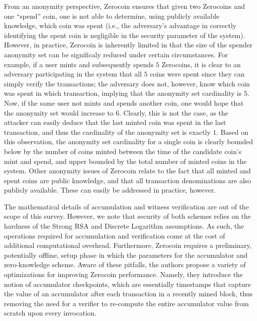 From an anonymity perspective, Zerocoin ensures that given two Zerocoins and one ``spend'' coin, one is not able to determine, using publicly available knowledge, which coin was spent (i.e., the adversary's advantage in correctly identifying the spent coin is negligible in the security parameter of the system). However, in practice, Zerocoin is inherently limited in that the size of the spender anonymity set can be significaly reduced under certain circumstances. For example, if a user mints and subsequently spends $5$ Zerocoins, it is clear to an adversary participating in the system that all $5$ coins were spent since they can simply verify the transactions; the adversary does not, however, know which coin was spent in which transaction, implying that the anonymity set cardinality is $5$. Now, if the same user not mints and spends another coin, one would hope that the anonymity set would increase to $6$. Clearly, this is not the case, as the attacker can easily deduce that the last minted coin was spent in the last transaction, and thus the cardinality of the anonymity set is exactly $1$. Based on this observation, the anonymity set cardinality for a single coin is clearly bounded below by the number of coins minted between the time of the candidate coin's mint and spend, and upper bounded by the total number of minted coins in the system. Other anonymity issues of Zerocoin relate to the fact that all minted and spent coins are public knowledge, and that all transaction denominations are also publicly available. These can easily be addressed in practice, however.

The mathematical details of accumulation and witness verification are out of the scope of this survey. However, we note that security of both schemes relies on the hardness of the Strong RSA and Discrete Logarithm assumptions. As such, the operations required for accumulation and verification come at the cost of additional computational overhead. Furthermore, Zerocoin requires a preliminary, potentially offline, setup phase in which the parameters for the accumulator and zero-knowledge scheme. Aware of these pitfalls, the authors propose a variety of optimizations for improving Zerocoin performance. Namely, they introduce the notion of accumulator checkpoints, which are essentially timestamps that capture the value of an accumulator after each transaction in a recently mined block, thus removing the need for a verifier to re-compute the entire accumulator value from scratch upon every invocation. 


